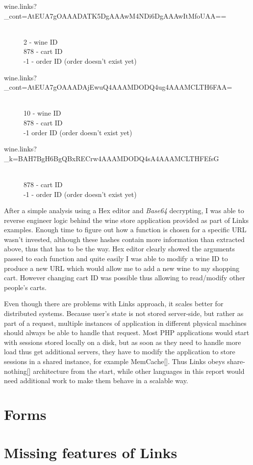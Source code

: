 \begin{description}
  \item[wine.links?\_cont=AtEUA7gOAAADATK5DgAAAwM4NDi6DgAAAwItMfoUAA==] \hfill \\
  2 - wine ID \\
  878 - cart ID \\
  -1 - order ID (order doesn't exist yet)
  \item[wine.links?\_cont=AtEUA7gOAAADAjEwuQ4AAAMDODQ4ug4AAAMCLTH6FAA=] \hfill \\
  10 - wine ID \\
  878 - cart ID \\
  -1 order ID (order doesn't exist yet)
  \item[wine.links?\_k=BAH7BgH6BgQBxRECrw4AAAMDODQ4sA4AAAMCLTHFEfsG] \hfill \\
  878 - cart ID \\
  -1 - order ID (order doesn't exist yet)
\end{description}

After a simple analysis using a Hex editor and \textit{Base64} decrypting, I was able to reverse engineer logic behind the wine store application provided as part of Links examples. Enough time to figure out how a function is chosen for a specific URL wasn't invested, although these hashes contain more information than extracted above, thus that has to be the way. Hex editor clearly showed the arguments passed to each function and quite easily I was able to modify a wine ID to produce a new URL which would allow me to add a new wine to my shopping cart. However changing cart ID was possible thus allowing to read/modify other people's carts.

Even though there are problems with Links approach, it scales better for distributed systems. Because user's state is not stored server-side, but rather as part of a request, multiple instances of application in different physical machines should always be able to handle that request. Most PHP applications would start with sessions stored locally on a disk, but as soon as they need to handle more load thus get additional servers, they have to modify the application to store sessions in a shared instance, for example MemCache[]. Thus Links obeys share-nothing[] architecture from the start, while other languages in this report would need additional work to make them behave in a scalable way.

\section{Forms}

\section{Missing features of Links}
